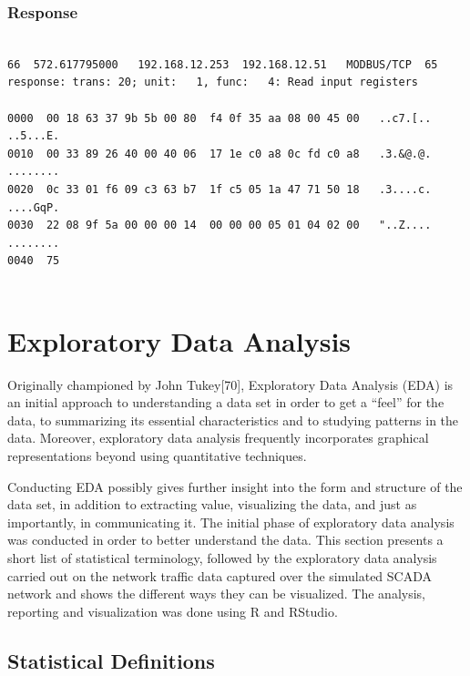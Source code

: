 \documentclass[11pt,a4paper]{article}
\begin{document}
\subsubsection{Response}\label{response}

\begin{verbatim}

66  572.617795000   192.168.12.253  192.168.12.51   MODBUS/TCP  65
response: trans: 20; unit:   1, func:   4: Read input registers

0000  00 18 63 37 9b 5b 00 80  f4 0f 35 aa 08 00 45 00   ..c7.[.. ..5...E.
0010  00 33 89 26 40 00 40 06  17 1e c0 a8 0c fd c0 a8   .3.&@.@. ........
0020  0c 33 01 f6 09 c3 63 b7  1f c5 05 1a 47 71 50 18   .3....c. ....GqP.
0030  22 08 9f 5a 00 00 00 14  00 00 00 05 01 04 02 00   "..Z.... ........
0040  75
    
\end{verbatim}

\newpage

\section{Exploratory Data Analysis}\label{exploratory-data-analysis}

Originally championed by John Tukey{[}70{]}, Exploratory Data Analysis
(EDA) is an initial approach to understanding a data set in order to get
a ``feel'' for the data, to summarizing its essential characteristics
and to studying patterns in the data. Moreover, exploratory data
analysis frequently incorporates graphical representations beyond using
quantitative techniques.

Conducting EDA possibly gives further insight into the form and
structure of the data set, in addition to extracting value, visualizing
the data, and just as importantly, in communicating it. The initial
phase of exploratory data analysis was conducted in order to better
understand the data. This section presents a short list of statistical
terminology, followed by the exploratory data analysis carried out on
the network traffic data captured over the simulated SCADA network and
shows the different ways they can be visualized. The analysis, reporting
and visualization was done using R and RStudio.

\subsection{Statistical Definitions}\label{statistical-definitions}
\end{document}

